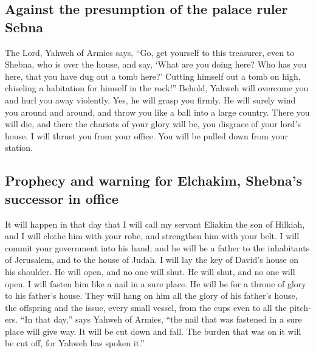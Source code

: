 \begin{paracol}{2}
\begin{otherlanguage}{english}
\hypertarget{against-the-presumption-of-the-palace-ruler-sebna}{%
\subsection{Against the presumption of the palace ruler
Sebna}\label{against-the-presumption-of-the-palace-ruler-sebna}}

 The Lord, Yahweh of Armies says, ``Go, get yourself to
this treasurer, even to Shebna, who is over the house, and say,
 `What are you doing here? Who has you here, that you
have dug out a tomb here?' Cutting himself out a tomb on high, chiseling
a habitation for himself in the rock!''  Behold, Yahweh
will overcome you and hurl you away violently. Yes, he will grasp you
firmly.  He will surely wind you around and around, and
throw you like a ball into a large country. There you will die, and
there the chariots of your glory will be, you disgrace of your lord's
house.  I will thrust you from your office. You will be
pulled down from your station.

\hypertarget{prophecy-and-warning-for-elchakim-shebnas-successor-in-office}{%
\subsection{Prophecy and warning for Elchakim, Shebna's successor in
office}\label{prophecy-and-warning-for-elchakim-shebnas-successor-in-office}}

 It will happen in that day that I will call my servant
Eliakim the son of Hilkiah,  and I will clothe him with
your robe, and strengthen him with your belt. I will commit your
government into his hand; and he will be a father to the inhabitants of
Jerusalem, and to the house of Judah.  I will lay the key
of David's house on his shoulder. He will open, and no one will shut. He
will shut, and no one will open.  I will fasten him like
a nail in a sure place. He will be for a throne of glory to his father's
house.  They will hang on him all the glory of his
father's house, the offspring and the issue, every small vessel, from
the cups even to all the pitchers.  ``In that day,'' says
Yahweh of Armies, ``the nail that was fastened in a sure place will give
way. It will be cut down and fall. The burden that was on it will be cut
off, for Yahweh has spoken it.''

\end{otherlanguage}


\end{paracol}
